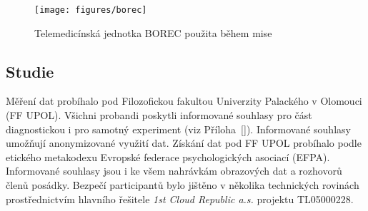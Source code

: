 \begin{figure}[h]
    \begin{center}
        \texttt{[image: figures/borec]}
        \caption{Telemedicínská jednotka BOREC použita během mise}
        \label{fig:borec}
    \end{center}
\end{figure}


\subsection{Studie}
\label{subsec:studie}
Měření dat probíhalo pod Filozofickou fakultou Univerzity Palackého v Olomouci
(\gls{FF UPOL}). Všichni probandi poskytli informované souhlasy pro část
diagnostickou i pro samotný experiment (viz Příloha~\ref{}). Informované
souhlasy umožňují anonymizované využití dat. Získání dat pod FF UPOL probíhalo
podle etického metakodexu Evropské federace psychologických asociací
(\gls{EFPA}). Informované souhlasy jsou i ke všem nahrávkám obrazových dat a
rozhovorů členů posádky. Bezpečí participantů bylo jištěno v několika
technických rovinách prostřednictvím hlavního řešitele \textit{1st Cloud
Republic a.s.} projektu TL05000228.